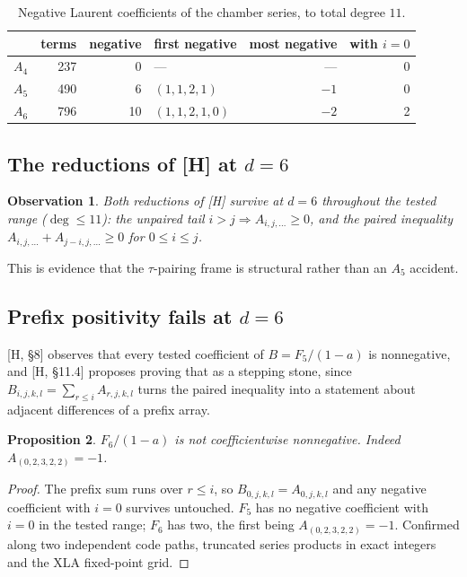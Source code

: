 \documentclass[11pt,a4paper]{article}
\theoremstyle{plain}
\newtheorem{proposition}{Proposition}
\newtheorem{observation}[proposition]{Observation}
\theoremstyle{definition}
\theoremstyle{remark}
\begin{document}
\begin{table}[ht]
\centering
\caption{Negative Laurent coefficients of the chamber series, to total degree $11$.}
\label{tab:series}
\begin{tabularx}{\textwidth}{@{}Lrrlrr@{}}
\toprule
 & terms & negative & first negative & most negative & with $i = 0$ \\
\midrule
$A_4$ & 237 & 0  & ---           & ---  & 0 \\
$A_5$ & 490 & 6  & $(1,1,2,1)$   & $-1$ & 0 \\
$A_6$ & 796 & 10 & $(1,1,2,1,0)$ & $-2$ & 2 \\
\bottomrule
\end{tabularx}
\end{table}

\subsection{The reductions of [H] at \texorpdfstring{$d = 6$}{d = 6}}

\begin{observation}
Both reductions of [H] survive at $d = 6$ throughout the tested range ($\deg \le 11$): the
unpaired tail $i > j \Rightarrow A_{i,j,\dots} \ge 0$, and the paired inequality
$A_{i,j,\dots} + A_{j-i,j,\dots} \ge 0$ for $0 \le i \le j$.
\end{observation}

This is evidence that the $\tau$-pairing frame is structural rather than an $A_5$ accident.

\subsection{Prefix positivity fails at \texorpdfstring{$d = 6$}{d = 6}}
\label{sec:prefix}

[H, \S8] observes that every tested coefficient of $B = F_5/(1-a)$ is nonnegative, and
[H, \S11.4] proposes proving that as a stepping stone, since
$B_{i,j,k,l} = \sum_{r \le i} A_{r,j,k,l}$ turns the paired inequality into a statement about
adjacent differences of a prefix array.

\begin{proposition}
$F_6/(1-a)$ is not coefficientwise nonnegative. Indeed $A_{(0,2,3,2,2)} = -1$.
\end{proposition}

\begin{proof}
The prefix sum runs over $r \le i$, so $B_{0,j,k,l} = A_{0,j,k,l}$ and any negative coefficient
with $i = 0$ survives untouched. $F_5$ has no negative coefficient with $i = 0$ in the tested
range; $F_6$ has two, the first being $A_{(0,2,3,2,2)} = -1$. Confirmed along two independent
code paths, truncated series products in exact integers and the XLA fixed-point grid.
\end{proof}
\end{document}
